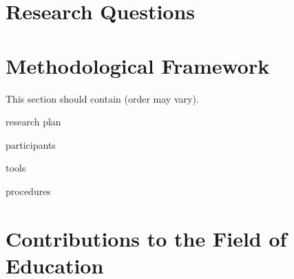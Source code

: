 \documentclass[
doc, 
biblatex,
12pt
]{apa6}
\begin{document}
\lipsum[2]

\section{Research Questions}
\lipsum[3]

\section{Methodological Framework}
This section should contain (order may vary).

\begin{APAitemize}
\item research plan
\item participants
\item tools
\item procedures
\end{APAitemize}


\section{Contributions to the Field of Education}
\lipsum[4]

\printbibliography[title=References]
\end{document}
